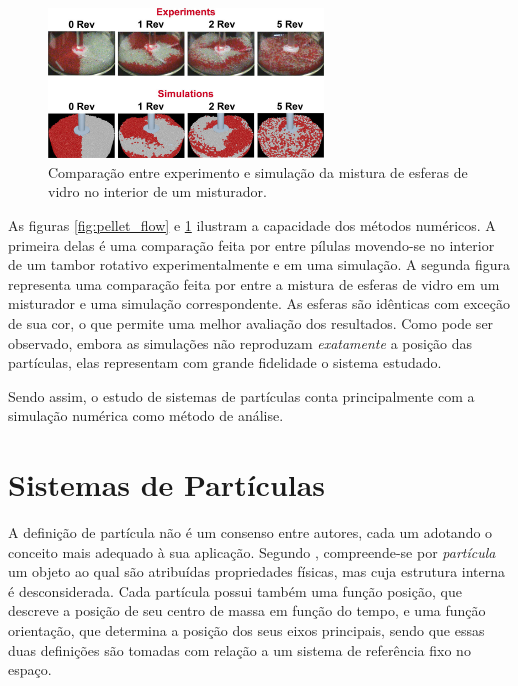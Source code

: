 \begin{figure}[h]
	\caption{Comparação entre experimento e simulação da mistura de esferas de vidro no interior de um misturador.}
	\vspace{-0.5cm}
	\begin{center}
		\includegraphics[width=0.65\textwidth]{images/introduction/drug_production.png}
	\end{center}
	\vspace{-0.2cm}
	\label{fig:drug_production}
	\vspace{-1cm}
\end{figure}

As figuras \ref{fig:pellet_flow} e \ref{fig:drug_production} ilustram a capacidade dos métodos numéricos. A primeira delas é uma comparação feita por  entre pílulas movendo-se no interior de um tambor rotativo experimentalmente e em uma simulação. A segunda figura representa uma comparação feita por  entre a mistura de esferas de vidro em um misturador e uma simulação correspondente. As esferas são idênticas com exceção de sua cor, o que permite uma melhor avaliação dos resultados. Como pode ser observado, embora as simulações não reproduzam \textit{exatamente} a posição das partículas, elas representam com grande fidelidade o sistema estudado.

Sendo assim, o estudo de sistemas de partículas conta principalmente com a simulação numérica como método de análise.
 
\section{Sistemas de Partículas}

A definição de partícula não é um consenso entre autores, cada um adotando o conceito mais adequado à sua aplicação. Segundo , compreende-se por \textit{partícula} um objeto ao qual são atribuídas propriedades físicas, mas cuja estrutura interna é desconsiderada. Cada partícula possui também uma função posição, que descreve a posição de seu centro de massa em função do tempo, e uma função orientação, que determina a posição dos seus eixos principais, sendo que essas duas definições são tomadas com relação a um sistema de referência fixo no espaço.

